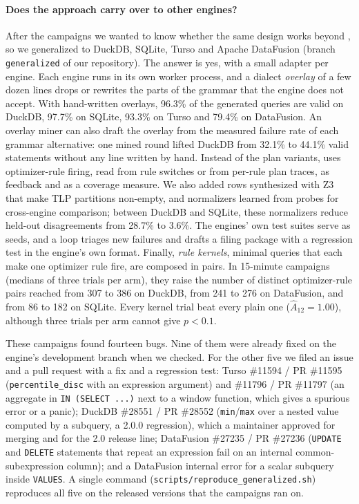 \paragraph{Does the approach carry over to other engines?}
\label{sec:beyond}
After the \pg campaigns we wanted to know whether the same design works beyond
\pg, so we generalized \tool to DuckDB, SQLite, Turso and Apache DataFusion
(branch \texttt{generalized} of our repository). The answer is yes, with a small
adapter per engine. Each engine runs in its own worker process, and a dialect
\emph{overlay} of a few dozen lines drops or rewrites the parts of the \pg
grammar that the engine does not accept. With hand-written overlays, 96.3\% of
the generated queries are valid on DuckDB, 97.7\% on SQLite, 93.3\% on Turso
and 79.4\% on DataFusion. An overlay miner can also draft the overlay from the
measured failure rate of each grammar alternative: one mined round lifted DuckDB
from 32.1\% to 44.1\% valid statements without any line written by hand. Instead of the
\pg plan variants, \tool uses optimizer-rule firing, read from rule switches or
from per-rule plan traces, as feedback and as a coverage measure. We also added rows synthesized with Z3 that make TLP
partitions non-empty, and normalizers learned from probes for cross-engine
comparison; between DuckDB and SQLite, these normalizers reduce held-out
disagreements from 28.7\% to 3.6\%. The engines' own test suites serve as seeds,
and a loop triages new failures and drafts a filing package with a regression
test in the engine's own format.
Finally, \emph{rule kernels}, minimal queries that each make one optimizer rule
fire, are composed in pairs. In 15-minute campaigns (medians of three trials per
arm), they raise the number of distinct optimizer-rule pairs reached from 307 to
386 on DuckDB, from 241 to 276 on DataFusion, and from 86 to 182 on SQLite.
Every kernel trial beat every plain one ($\hat{A}_{12}=1.00$), although three
trials per arm cannot give $p<0.1$.

These campaigns found fourteen bugs. Nine of them were already fixed on the
engine's development branch when we checked. For the other five we filed an
issue and a pull request with a fix and a regression test: Turso \#11594 / PR
\#11595 (\texttt{percentile\_disc} with an expression argument) and \#11796 / PR
\#11797 (an aggregate in \texttt{IN (SELECT ...)} next to a window function,
which gives a spurious error or a panic); DuckDB \#28551 / PR \#28552
(\texttt{min}/\texttt{max} over a nested value computed by a subquery, a 2.0.0
regression), which a maintainer approved for merging and for the 2.0 release
line; DataFusion \#27235 / PR \#27236 (\texttt{UPDATE} and \texttt{DELETE}
statements that repeat an expression fail on an internal common-subexpression
column); and a DataFusion internal error for a scalar subquery inside
\texttt{VALUES}. A single command (\texttt{scripts/reproduce\_generalized.sh})
reproduces all five on the released versions that the campaigns ran on.
